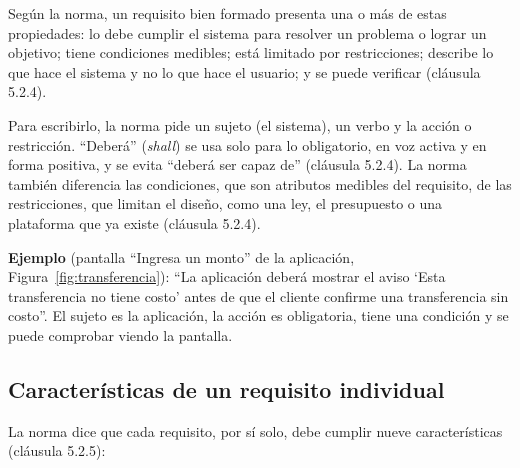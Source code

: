 \documentclass[11pt,a4paper]{article}
\begin{document}
Según la norma, un requisito bien formado presenta una o más de estas propiedades: lo debe cumplir el sistema para resolver un problema o lograr un objetivo; tiene condiciones medibles; está limitado por restricciones; describe lo que hace el sistema y no lo que hace el usuario; y se puede verificar (cláusula 5.2.4).

Para escribirlo, la norma pide un sujeto (el sistema), un verbo y la acción o restricción. “Deberá” (\emph{shall}) se usa solo para lo obligatorio, en voz activa y en forma positiva, y se evita “deberá ser capaz de” (cláusula 5.2.4). La norma también diferencia las condiciones, que son atributos medibles del requisito, de las restricciones, que limitan el diseño, como una ley, el presupuesto o una plataforma que ya existe (cláusula 5.2.4).

\textbf{Ejemplo} (pantalla “Ingresa un monto” de la aplicación, Figura~\ref{fig:transferencia}): “La aplicación deberá mostrar el aviso ‘Esta transferencia no tiene costo’ antes de que el cliente confirme una transferencia sin costo”. El sujeto es la aplicación, la acción es obligatoria, tiene una condición y se puede comprobar viendo la pantalla.

\subsection{Características de un requisito individual}
La norma dice que cada requisito, por sí solo, debe cumplir nueve características (cláusula 5.2.5):
\end{document}
